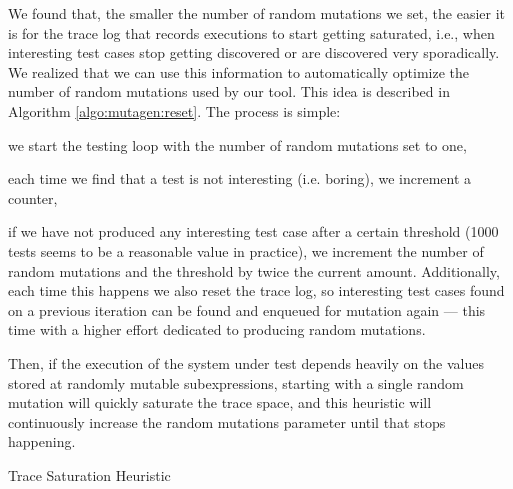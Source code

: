 \documentclass[sigconf, anonymous, review]{acmart}
\begin{document}
We found that, the smaller the number of random mutations we set, the easier it
is for the trace log that records executions to start getting saturated, i.e.,
when interesting test cases stop getting discovered or are discovered very
sporadically.
%
We realized that we can use this information to automatically optimize the
number of random mutations used by our tool.
%
This idea is described in Algorithm \ref{algo:mutagen:reset}.
%
The process is simple:
%
\begin{inparaenum}
  \item we start the testing loop with the number of random mutations set to
    one,
  \item each time we find that a test is not interesting (i.e. boring), we
    increment a counter,
  \item if we have not produced any interesting test case after a certain
    threshold (1000 tests seems to be a reasonable value in practice), we
    increment the number of random mutations and the threshold by twice the
    current amount.
    Additionally, each time this happens we also reset the trace log, so
    interesting test cases found on a previous iteration can be found and
    enqueued for mutation again --- this time with a higher effort dedicated to
    producing random mutations.
\end{inparaenum}

Then, if the execution of the system under test depends heavily on the values
stored at randomly mutable subexpressions, starting with a single random
mutation will quickly saturate the trace space, and this heuristic will
continuously increase the random mutations parameter until that stops happening.

\begin{algorithm}[t]
  \SetAlgoLined
  \DontPrintSemicolon

\caption{\label{algo:mutagen:reset}Trace Saturation Heuristic}
\end{algorithm}
\end{document}
